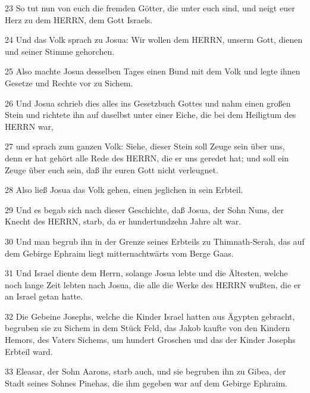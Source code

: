 \par 23 So tut nun von euch die fremden Götter, die unter euch sind, und neigt euer Herz zu dem HERRN, dem Gott Israels.
\par 24 Und das Volk sprach zu Josua: Wir wollen dem HERRN, unserm Gott, dienen und seiner Stimme gehorchen.
\par 25 Also machte Josua desselben Tages einen Bund mit dem Volk und legte ihnen Gesetze und Rechte vor zu Sichem.
\par 26 Und Josua schrieb dies alles ins Gesetzbuch Gottes und nahm einen großen Stein und richtete ihn auf daselbst unter einer Eiche, die bei dem Heiligtum des HERRN war,
\par 27 und sprach zum ganzen Volk: Siehe, dieser Stein soll Zeuge sein über uns, denn er hat gehört alle Rede des HERRN, die er uns geredet hat; und soll ein Zeuge über euch sein, daß ihr euren Gott nicht verleugnet.
\par 28 Also ließ Josua das Volk gehen, einen jeglichen in sein Erbteil.
\par 29 Und es begab sich nach dieser Geschichte, daß Josua, der Sohn Nuns, der Knecht des HERRN, starb, da er hundertundzehn Jahre alt war.
\par 30 Und man begrub ihn in der Grenze seines Erbteils zu Thimnath-Serah, das auf dem Gebirge Ephraim liegt mitternachtwärts vom Berge Gaas.
\par 31 Und Israel diente dem Herrn, solange Josua lebte und die Ältesten, welche noch lange Zeit lebten nach Josua, die alle die Werke des HERRN wußten, die er an Israel getan hatte.
\par 32 Die Gebeine Josephs, welche die Kinder Israel hatten aus Ägypten gebracht, begruben sie zu Sichem in dem Stück Feld, das Jakob kaufte von den Kindern Hemors, des Vaters Sichems, um hundert Groschen und das der Kinder Josephs Erbteil ward.
\par 33 Eleasar, der Sohn Aarons, starb auch, und sie begruben ihn zu Gibea, der Stadt seines Sohnes Pinehas, die ihm gegeben war auf dem Gebirge Ephraim.


